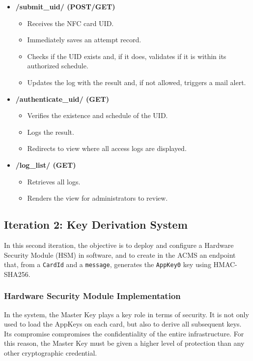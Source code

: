 \begin{itemize}
	\item \textbf{/submit\_uid/ (POST/GET)}
	\begin{itemize}
		\item Receives the NFC card UID.
		\item Immediately saves an attempt record.
		\item Checks if the UID exists and, if it does, validates if it is within its authorized schedule.
		\item Updates the log with the result and, if not allowed, triggers a mail alert.
	\end{itemize}
	
	\item \textbf{/authenticate\_uid/ (GET)}
	\begin{itemize}
		\item Verifies the existence and schedule of the UID.
		\item Logs the result.
		\item Redirects to view where all access logs are displayed.
	\end{itemize}
	
	\item \textbf{/log\_list/ (GET)}
	\begin{itemize}
		\item Retrieves all logs.
		\item Renders the view for administrators to review.
	\end{itemize}
\end{itemize}

\subsection{Iteration 2: Key Derivation System}

In this second iteration, the objective is to deploy and configure a Hardware Security Module (HSM) in software, and to create in the ACMS an endpoint that, from a \texttt{CardId} and a \texttt{message}, generates the \texttt{AppKey0} key using HMAC-SHA256.

\subsubsection{Hardware Security Module Implementation}

In the system, the Master Key plays a key role in terms of security. It is not only used to load the AppKeys on each card, but also to derive all subsequent keys. Its compromise compromises the confidentiality of the entire infrastructure. For this reason, the Master Key must be given a higher level of protection than any other cryptographic credential.

